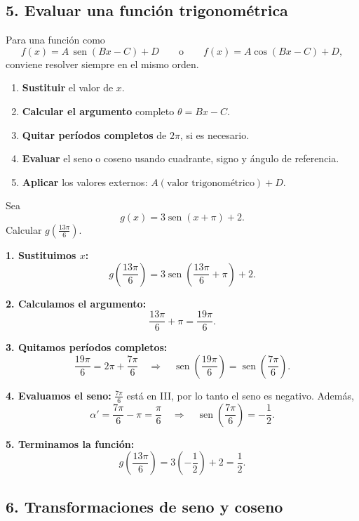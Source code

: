 \documentclass[12pt,letterpaper]{article}
\providecommand{\sen}{\operatorname{sen}}
\begin{document}
\newpage
\subsection{5. Evaluar una función trigonométrica}

Para una función como
\[
f(x)=A\,\sen(Bx-C)+D
\qquad\text{o}\qquad
f(x)=A\cos(Bx-C)+D,
\]
conviene resolver siempre en el mismo orden.

\begin{estrategiabox}[Procedimiento]
\begin{enumerate}[leftmargin=*,itemsep=0.2em]
    \item \textbf{Sustituir} el valor de $x$.
    \item \textbf{Calcular el argumento} completo $\theta=Bx-C$.
    \item \textbf{Quitar períodos completos} de $2\pi$, si es necesario.
    \item \textbf{Evaluar} el seno o coseno usando cuadrante, signo y ángulo de referencia.
    \item \textbf{Aplicar} los valores externos: $A(\text{valor trigonométrico})+D$.
\end{enumerate}
\end{estrategiabox}

\begin{ejemplobox}
Sea
\[
g(x)=3\sen(x+\pi)+2.
\]
Calcular $g\left(\frac{13\pi}{6}\right)$.

\textbf{1. Sustituimos $x$:}
\[
g\left(\frac{13\pi}{6}\right)
=3\sen\left(\frac{13\pi}{6}+\pi\right)+2.
\]

\textbf{2. Calculamos el argumento:}
\[
\frac{13\pi}{6}+\pi=\frac{19\pi}{6}.
\]

\textbf{3. Quitamos períodos completos:}
\[
\frac{19\pi}{6}=2\pi+\frac{7\pi}{6}
\quad\Longrightarrow\quad
\sen\left(\frac{19\pi}{6}\right)=\sen\left(\frac{7\pi}{6}\right).
\]

\textbf{4. Evaluamos el seno:} $\frac{7\pi}{6}$ está en III, por lo tanto el seno es negativo. Además,
\[
\alpha'=\frac{7\pi}{6}-\pi=\frac{\pi}{6}
\quad\Longrightarrow\quad
\sen\left(\frac{7\pi}{6}\right)=-\frac12.
\]

\textbf{5. Terminamos la función:}
\[
g\left(\frac{13\pi}{6}\right)
=3\left(-\frac12\right)+2
=\frac12.
\]
\end{ejemplobox}

\newpage
\subsection{6. Transformaciones de seno y coseno}
\end{document}
